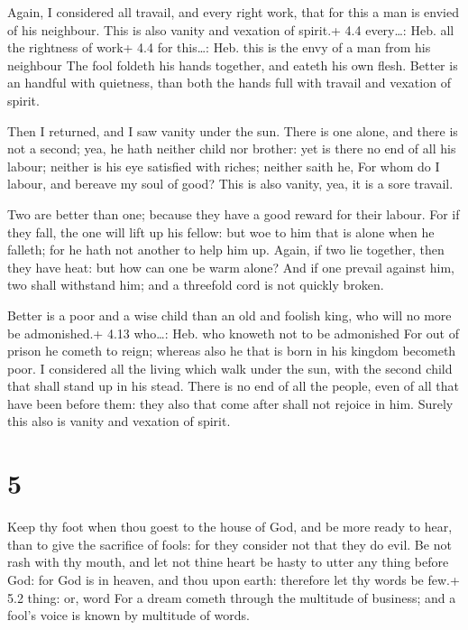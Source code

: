  Again, I considered all travail, and every right work,
that for this a man is envied of his neighbour. This is also vanity and
vexation of spirit.+ 4.4 every\ldots: Heb. all the rightness of work+
4.4 for this\ldots: Heb. this is the envy of a man from his neighbour
 The fool foldeth his hands together, and eateth his own
flesh.  Better is an handful with quietness, than both the
hands full with travail and vexation of spirit.

 Then I returned, and I saw vanity under the sun.
 There is one alone, and there is not a second; yea, he hath
neither child nor brother: yet is there no end of all his labour;
neither is his eye satisfied with riches; neither saith he, For whom do
I labour, and bereave my soul of good? This is also vanity, yea, it is a
sore travail.

 Two are better than one; because they have a good reward
for their labour.  For if they fall, the one will lift up
his fellow: but woe to him that is alone when he falleth; for he hath
not another to help him up.  Again, if two lie together,
then they have heat: but how can one be warm alone?  And if
one prevail against him, two shall withstand him; and a threefold cord
is not quickly broken.

 Better is a poor and a wise child than an old and
foolish king, who will no more be admonished.+ 4.13 who\ldots: Heb. who
knoweth not to be admonished  For out of prison he cometh
to reign; whereas also he that is born in his kingdom becometh poor.
 I considered all the living which walk under the sun, with
the second child that shall stand up in his stead.  There
is no end of all the people, even of all that have been before them:
they also that come after shall not rejoice in him. Surely this also is
vanity and vexation of spirit.

\hypertarget{section-4}{%
\section{5}\label{section-4}}

 Keep thy foot when thou goest to the house of God, and be
more ready to hear, than to give the sacrifice of fools: for they
consider not that they do evil.  Be not rash with thy mouth,
and let not thine heart be hasty to utter any thing before God: for God
is in heaven, and thou upon earth: therefore let thy words be few.+ 5.2
thing: or, word  For a dream cometh through the multitude of
business; and a fool's voice is known by multitude of words.

